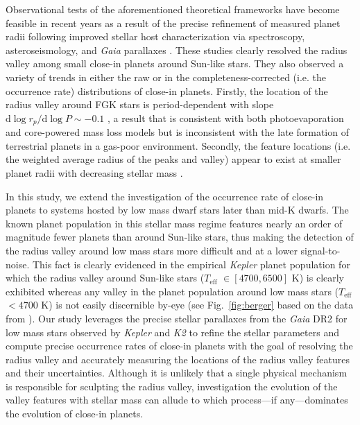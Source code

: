 \documentclass[twocolumn]{emulateapj}
\newcommand{\gaia}[1]{\emph{Gaia}#1}
\newcommand{\kepler}[1]{\emph{Kepler}#1}
\newcommand{\ktwo}[1]{\emph{K2}#1}
\newcommand{\teff}[1]{$T_{\text{eff}}$#1}
\begin{document}
Observational tests of the aforementioned theoretical frameworks have become feasible in recent years as a result 
of the precise refinement of measured planet radii following improved stellar host characterization via  
spectroscopy, asteroseismology, and \gaia{} parallaxes
\citep[e.g.][]{fulton17,vaneylen18,fulton18,martinez19}. These studies clearly resolved the radius valley 
among small close-in planets around Sun-like stars. They also observed a variety of trends in either
the raw or in the completeness-corrected (i.e. the occurrence rate) distributions of close-in planets. Firstly,
the location of the radius valley around FGK stars is period-dependent with slope
$\mathrm{d}\log{r_p} / \mathrm{d}\log{P} \sim -0.1$ \citep{vaneylen18,martinez19}, a result that is consistent
with both photoevaporation and core-powered mass loss models but is inconsistent with the late formation of
terrestrial planets in a gas-poor environment. Secondly, the feature locations (i.e. the weighted
average radius of the peaks and valley) appear to exist at smaller planet radii with decreasing stellar
mass \citep{fulton18,wu19}.

In this study, we extend the investigation of the occurrence rate of close-in planets to systems hosted by
low mass dwarf stars
later than mid-K dwarfs. The known planet population in this stellar mass regime features nearly an order of magnitude
fewer planets than around Sun-like stars, thus making the detection of the radius valley around low mass stars more
difficult and at a lower signal-to-noise. This fact is clearly evidenced in the empirical \kepler{} planet population
for which the radius valley around Sun-like stars (\teff{} $\in [4700,6500]$ K) is clearly exhibited whereas any valley
in the planet population around low mass stars (\teff{} $< 4700$ K) is not easily discernible by-eye (see
Fig.~\ref{fig:berger} based on the data from \citealt{berger18}).
Our study leverages the precise stellar parallaxes from the \gaia{} DR2
for low mass stars observed by \kepler{} and \ktwo{} to refine the stellar parameters and compute precise
occurrence rates of close-in planets with the goal of resolving the radius valley and accurately measuring the
locations of the radius valley features and their uncertainties. Although it is unlikely that a single physical
mechanism is responsible for sculpting the radius valley, investigation the evolution of the valley features with
stellar mass can allude to which process---if any---dominates the evolution of close-in planets.
\end{document}
